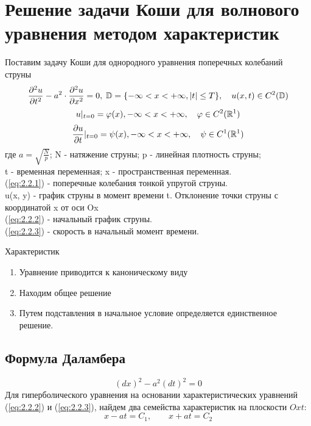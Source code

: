 \documentclass[../main.tex]{subfiles}
\begin{document}
\section{Решение задачи Коши для волнового уравнения методом характеристик}
Поставим задачу Коши для однородного уравнения поперечных колебаний струны
\begin{equation}
    \label{eq:2.2.1}
    \frac{\partial^2u}{\partial t^2}-a^2 \cdot \frac{\partial^2u}{\partial x^2}=0, \;
    \mathbb{D}=\lbrace- \infty<x<+\infty, |t|\leq T \rbrace, \quad
    u(x,t) \in C^2(\mathbb{D})
\end{equation}
\begin{equation} 
    \label{eq:2.2.2}
    u|_{t=0} = \varphi(x), -\infty<x<+\infty, \quad \varphi \in C^2(\mathbb{R}^1)
\end{equation}
\begin{equation} 
    \label{eq:2.2.3}
    \frac{\partial u}{\partial t}|_{t=0} = \psi(x),  -\infty<x<+\infty, \quad \psi \in C^1(\mathbb{R}^1)
\end{equation}
где $a=\sqrt{\frac{N}{p}}$; \quad N - натяжение струны; \quad p - линейная плотность струны;\\
t - временная переменная; \quad x - пространственная переменная.\\
(\ref{eq:2.2.1}) - поперечные колебания тонкой упругой струны.\\
u(x, y) - график струны в момент времени t. Отклонение точки струны с координатой x от оси Ox\\
(\ref{eq:2.2.2}) - начальный график струны.\\
(\ref{eq:2.2.3}) - скорость в начальный момент времени.\\
\begin{center}
    { Характеристик}\\
    \begin{enumerate}
        \item 
        Уравнение приводится к каноническому виду
        \item
        Находим общее решение
        \item
        Путем подставления в начальное условие определяется единственное решение.
    \end{enumerate}
\end{center}

\subsection{Формула Даламбера}
\begin{equation*}
    (dx)^2-a^2(dt)^2=0
\end{equation*}
Для гиперболического уравнения на основании характеристических уравнений (\ref{eq:2.2.2}) и (\ref{eq:2.2.3}),
 найдем два семейства характеристик на плоскости $Oxt$:
\[x-at=C_1, \qquad  x+at=C_2\]
\end{document}
